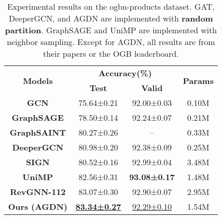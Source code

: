 \documentclass{article}
\begin{document}
\begin{table}[hbt]
\caption{Experimental results on the ogbn-products dataset. GAT, DeeperGCN, and AGDN are implemented with \textbf{random partition}. GraphSAGE and UniMP are implemented with neighbor sampling. Except for AGDN, all results are from their papers or the OGB leaderboard.}
\begin{center}
\begin{tabular}[l]{c|cc|c}
\toprule[1pt]
\multirow{2}{*}{\textbf{Models}} & \multicolumn{2}{c|}{\textbf{Accuracy(\%)}} & \multirow{2}{*}{\textbf{Params}} \\ 
 & \textbf{Test} & \textbf{Valid} & \\
\midrule
\textbf{GCN}  & 75.64\scriptsize{±0.21} & 92.00\scriptsize{±0.03} & 0.10M \\ 
\textbf{GraphSAGE} & 78.50\scriptsize{±0.14} & 92.24\scriptsize{±0.07} & 0.21M \\
\textbf{GraphSAINT} & 80.27\scriptsize{±0.26} & – & 0.33M \\
\textbf{DeeperGCN} & 80.98\scriptsize{±0.20} & 92.38\scriptsize{±0.09} & 0.25M \\
\textbf{SIGN} & 80.52\scriptsize{±0.16} & 92.99\scriptsize{±0.04} & 3.48M \\
\textbf{UniMP} & 82.56\scriptsize{±0.31} & \textbf{93.08\scriptsize{±0.17}} & 1.48M \\
\textbf{RevGNN-112} & 83.07\scriptsize{±0.30} & 92.90\scriptsize{±0.07} & 2.95M \\
\textbf{Ours (AGDN)} & \underline{\textbf{83.34\scriptsize{±0.27}}} & \underline{92.29\scriptsize{±0.10}} & 1.54M \\ 
\bottomrule[1pt]

\end{tabular}
\end{center}
\label{tab: experiments on ogbn-products}
\end{table}
\end{document}
